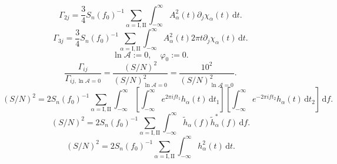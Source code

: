 \documentclass[a3paper]{ctexart}
\def\d{\mathrm{d}}
\begin{document}
    \begin{equation*}
        \Gamma_{2j}=\frac{3}{4}S_n(f_0)^{-1}\sum_{\alpha=\text{I},\text{II}}\int_{-\infty}^{\infty}A^2_\alpha(t)\partial_j \chi_\alpha(t)\,\d t.
    \end{equation*}
    \begin{equation*}
        \Gamma_{3j}=\frac{3}{4}S_n(f_0)^{-1}\sum_{\alpha=\text{I},\text{II}}\int_{-\infty}^{\infty}A^2_\alpha(t)2\pi t\partial_j \chi_\alpha(t)\,\d t.
    \end{equation*}
    \begin{equation*}
        \ln\mathcal{A}:=0,\quad\varphi_0:=0.
    \end{equation*}
    \begin{equation*}
        \frac{\Gamma_{ij}}{\Gamma_{ij,\ln\mathcal{A}=0}}=\frac{(S/N)^2}{(S/N)_{\ln\mathcal{A}=0}^2}=\frac{10^2}{(S/N)_{\ln\mathcal{A}=0}^2}.
    \end{equation*}
    \begin{equation*}
        (S/N)^2=2S_n(f_0)^{-1}\sum_{\alpha=\text{I},\text{II}}\int_{-\infty}^{\infty}\left[\int_{-\infty}^{\infty}e^{2\pi i ft_1}h_\alpha(t)\,\d t_1\right]\left[\int_{-\infty}^{\infty}e^{-2\pi i ft_2}h_\alpha(t)\,\d t_2\right]\,\d f.
    \end{equation*}
    \begin{equation*}
        (S/N)^2=2S_n(f_0)^{-1}\sum_{\alpha=\text{I},\text{II}}\int_{-\infty}^{\infty}\tilde{h}_\alpha(f)\tilde{h}_\alpha^*(f)\,\d f.
    \end{equation*}
    \begin{equation*}
        (S/N)^2=2S_n(f_0)^{-1}\sum_{\alpha=\text{I},\text{II}}\int_{-\infty}^{\infty}h_\alpha^2(t)\,\d t.
    \end{equation*}
\end{document}
